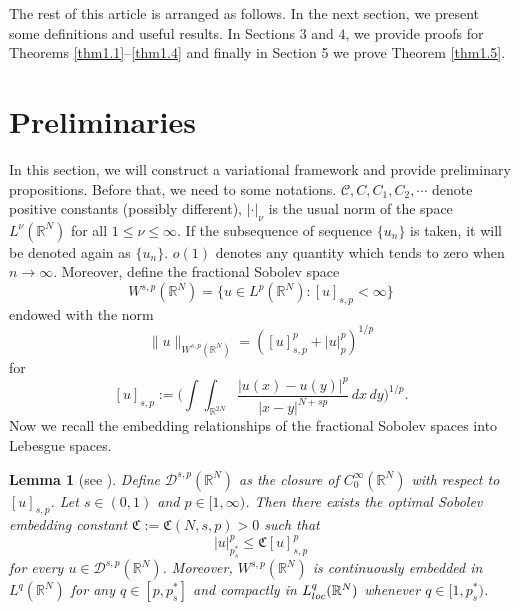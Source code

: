 \documentclass[10pt,a4paper]{amsart}
\numberwithin{equation}{section}
\newtheorem{lemma}[theorem]{Lemma}
\begin{document}
The rest of this article is arranged as follows. 
In the next section, we present some definitions and useful results.
 In Sections $3$ and $4$, we provide proofs for Theorems \ref{thm1.1}--\ref{thm1.4} 
and finally in Section 5 we prove Theorem \ref{thm1.5}.

\section{Preliminaries}

In this section, we will construct a variational framework and provide
preliminary propositions. Before that, we need to some notations. 
$\mathcal{C}, C, C_1, C_2, \cdots$ denote positive constants (possibly different), 
$|\cdot|_\nu$ is the usual norm of the space $L^{\nu}(\mathbb{R}^N)$ for all 
$1\leq \nu\leq \infty$. If the subsequence of sequence $\{u_n\}$ is taken, 
it will be denoted again as $\{u_n\}$. $o(1)$ denotes any quantity which tends 
to zero when $n\to  \infty$. Moreover, define the fractional Sobolev space
$$
W^{s,p}(\mathbb{R}^N)=\{u\in L^p(\mathbb{R}^N): [u]_{s,p}<\infty\}
$$
endowed with the norm
$$
\|u\|_{W^{s,p}(\mathbb{R}^N)}=([u]_{s,p}^p+|u|^p_p)^{1/p}
$$
for
$$
[u]_{s,p}:=\Big(\int\int_{\mathbb{R}^{2N}}\frac{|u(x)-u(y)|^p}{|x-y|^{N+sp}}\,dx\,dy
\Big)^{1/p}.
$$
Now we recall  the embedding relationships of the fractional Sobolev spaces 
into Lebesgue spaces.

\begin{lemma}[see \cite{r5}] \label{L2.1}
Define $\mathcal{D}^{s,p}(\mathbb{R}^N)$ as the closure of
$C_0^\infty(\mathbb{R}^N)$ with respect to $[u]_{s,p}$. Let $s\in(0, 1)$ and 
$p\in[1, \infty)$. Then there exists the optimal Sobolev embedding constant 
$\mathfrak{C}:=\mathfrak{C}(N, s, p)>0$ such that
$$
|u|_{p^*_s}^p\leq\mathfrak{C}[u]_{s,p}^p
$$
for every $u\in\mathcal{D}^{s,p}(\mathbb{R}^N)$. 
Moreover, $W^{s,p}(\mathbb{R}^N)$ is continuously embedded in $L^q(\mathbb{R}^N)$ 
for any $q\in[p, p^*_s]$ and compactly in $L_{\rm loc}^q(\mathbb{R}^N)$ whenever
$q\in[1, p^*_s)$.
\end{lemma}
\end{document}
